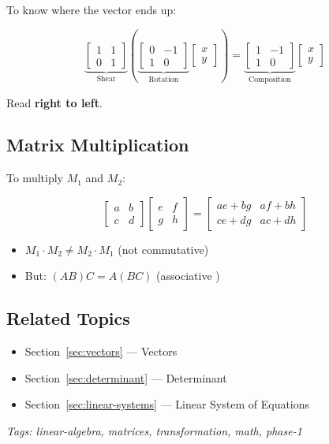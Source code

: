 To know where the vector ends up:

\[
\underbrace{\begin{bmatrix} 1 & 1 \\ 0 & 1 \end{bmatrix}}_{\text{Shear}}
\left(
\underbrace{\begin{bmatrix} 0 & -1 \\ 1 & 0 \end{bmatrix}}_{\text{Rotation}}
\begin{bmatrix} x \\ y \end{bmatrix}
\right)
=
\underbrace{\begin{bmatrix} 1 & -1 \\ 1 & 0 \end{bmatrix}}_{\text{Composition}}
\begin{bmatrix} x \\ y \end{bmatrix}
\]

\begin{notebox}
Read \textbf{right to left}.
\end{notebox}

\subsection{Matrix Multiplication}

To multiply $M_1$ and $M_2$:

\[
\begin{bmatrix} a & b \\ c & d \end{bmatrix}
\begin{bmatrix} e & f \\ g & h \end{bmatrix}
=
\begin{bmatrix} ae+bg & af+bh \\ ce+dg & ac+dh \end{bmatrix}
\]

\begin{notebox}
\begin{itemize}[nosep]
  \item $M_1 \cdot M_2 \neq M_2 \cdot M_1$ (not commutative)
  \item But: $(AB)C = A(BC)$ (associative \checkmark)
\end{itemize}
\end{notebox}

\subsection*{Related Topics}
\begin{itemize}[nosep]
  \item Section~\ref{sec:vectors} --- Vectors
  \item Section~\ref{sec:determinant} --- Determinant
  \item Section~\ref{sec:linear-systems} --- Linear System of Equations
\end{itemize}

\bigskip
\noindent\textit{Tags: linear-algebra, matrices, transformation, math, phase-1}
